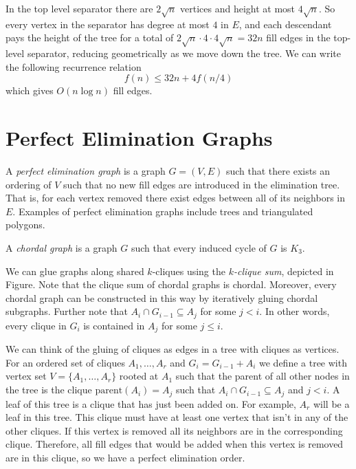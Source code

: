 \documentclass{article}
\begin{document}
In the top level separator there are $2\sqrt{n}$ vertices and height at most $4\sqrt{n}$.
So every vertex in the separator has degree at most $4$ in $E$, and each descendant pays the height of the tree for a total of $2\sqrt{n}\cdot 4\cdot 4\sqrt{n} = 32 n$ fill edges in the top-level separator, reducing geometrically as we move down the tree.
We can write the following recurrence relation
\[ f(n)\leq 32n + 4 f(n/4) \]
which gives $O(n\log n)$ fill edges.

\section{Perfect Elimination Graphs}

A \emph{perfect elimination graph} is a graph $G=(V,E)$ such that there exists an ordering of $V$ such that no new fill edges are introduced in the elimination tree.
That is, for each vertex removed there exist edges between all of its neighbors in $E$.
Examples of perfect elimination graphs include trees and triangulated polygons.

\begin{definition}
    A \emph{chordal graph} is a graph $G$ such that every induced cycle of $G$ is $K_3$.
\end{definition}



We can glue graphs along shared $k$-cliques using the \emph{$k$-clique sum}, depicted in Figure.%
Note that the clique sum of chordal graphs is chordal.
Moreover, every chordal graph can be constructed in this way by iteratively gluing chordal subgraphs.
Further note that $A_i\cap G_{i-1}\subseteq A_j$ for some $j < i$.
In other words, every clique in $G_i$ is contained in $A_j$ for some $j\leq i$.

We can think of the gluing of cliques as edges in a tree with cliques as vertices.
For an ordered set of cliques $A_1,\ldots, A_r$ and $G_i = G_{i-1} + A_i$ we define a tree with vertex set $V=\{A_1,\ldots, A_r\}$ rooted at $A_1$ such that the parent of all other nodes in the tree is the clique $\mathrm{parent}(A_i) = A_j$ such that $A_i\cap G_{i-1} \subseteq A_j$ and $j < i$.
A leaf of this tree is a clique that has just been added on.
For example, $A_r$ will be a leaf in this tree.
This clique must have at least one vertex that isn't in any of the other cliques.
If this vertex is removed all its neighbors are in the corresponding clique.
Therefore, all fill edges that would be added when this vertex is removed are in this clique, so we have a perfect elimination order.
\end{document}
